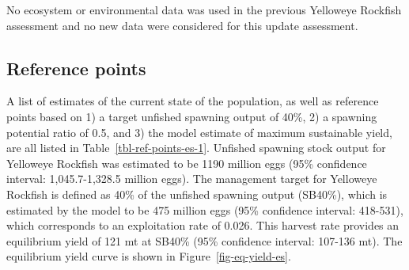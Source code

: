 \documentclass[
]{scrartcl}
\begin{document}
No ecosystem or environmental data was used in the previous Yelloweye
Rockfish assessment and no new data were considered for this update
assessment.

\subsection*{Reference points}\label{reference-points}

A list of estimates of the current state of the population, as well as
reference points based on 1) a target unfished spawning output of 40\%,
2) a spawning potential ratio of 0.5, and 3) the model estimate of
maximum sustainable yield, are all listed in
Table~\ref{tbl-ref-points-es-1}. Unfished spawning stock output for
Yelloweye Rockfish was estimated to be 1190 million eggs (95\%
confidence interval: 1,045.7-1,328.5 million eggs). The management
target for Yelloweye Rockfish is defined as 40\% of the unfished
spawning output (SB40\%), which is estimated by the model to be 475
million eggs (95\% confidence interval: 418-531), which corresponds to
an exploitation rate of 0.026. This harvest rate provides an equilibrium
yield of 121 mt at SB40\% (95\% confidence interval: 107-136 mt). The
equilibrium yield curve is shown in Figure~\ref{fig-eq-yield-es}.

\clearpage

\begingroup
\fontsize{9.0pt}{10.8pt}\selectfont
\end{document}
